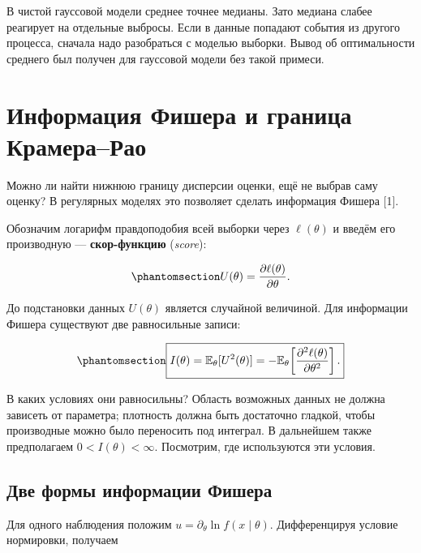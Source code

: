 \documentclass[
  russian,
  11pt,
  a4paper,
  open=any]{scrbook}
\begin{document}
В чистой гауссовой модели среднее точнее медианы. Зато медиана слабее
реагирует на отдельные выбросы. Если в данные попадают события из
другого процесса, сначала надо разобраться с моделью выборки. Вывод об
оптимальности среднего был получен для гауссовой модели без такой
примеси.

\section{Информация Фишера и граница
Крамера--Рао}\label{ux438ux43dux444ux43eux440ux43cux430ux446ux438ux44f-ux444ux438ux448ux435ux440ux430-ux438-ux433ux440ux430ux43dux438ux446ux430-ux43aux440ux430ux43cux435ux440ux430ux440ux430ux43e}

Можно ли найти нижнюю границу дисперсии оценки, ещё не выбрав саму
оценку? В регулярных моделях это позволяет сделать информация Фишера
{[}1{]}.

Обозначим логарифм правдоподобия всей выборки через \(\ell(\theta)\) и
введём его производную --- \textbf{скор-функцию} (\emph{score}):

\begin{equation}\protect\phantomsection\label{eq-ch10-score}{
U(\theta)=\frac{\partial\ell(\theta)}{\partial\theta}.
}\end{equation}

До подстановки данных \(U(\theta)\) является случайной величиной. Для
информации Фишера существуют две равносильные записи:

\begin{equation}\protect\phantomsection\label{eq-fisher-information}{
\boxed{
I(\theta)=\mathbb E_\theta[U^2(\theta)]
=-\mathbb E_\theta\!\left[
\frac{\partial^2\ell(\theta)}{\partial\theta^2}\right].
}
}\end{equation}

В каких условиях они равносильны? Область возможных данных не должна
зависеть от параметра; плотность должна быть достаточно гладкой, чтобы
производные можно было переносить под интеграл. В дальнейшем также
предполагаем \(0<I(\theta)<\infty\). Посмотрим, где используются эти
условия.

\subsection{Две формы информации
Фишера}\label{ux434ux432ux435-ux444ux43eux440ux43cux44b-ux438ux43dux444ux43eux440ux43cux430ux446ux438ux438-ux444ux438ux448ux435ux440ux430}

Для одного наблюдения положим \(u=\partial_\theta\ln f(x\mid\theta)\).
Дифференцируя условие нормировки, получаем
\end{document}
